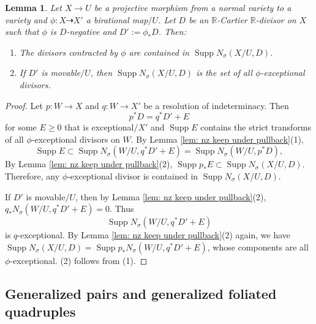 \documentclass[11pt]{amsart}
\numberwithin{equation}{section}
\newcommand{\Rr}{\mathbb{R}}
\newcommand{\Supp}{\operatorname{Supp}}
\newtheorem{lem}[thm]{Lemma}
\theoremstyle{definition}
\theoremstyle{definition}
\theoremstyle{definition}
\begin{document}
\begin{lem}\label{lem: nz for lc divisor}
Let $X\rightarrow U$ be a projective morphism from a normal variety to a variety and $\phi: X\dashrightarrow X'$ a birational map$/U$. Let $D$ be an $\Rr$-Cartier $\Rr$-divisor on $X$ such that $\phi$ is $D$-negative and $D':=\phi_*D$. Then:
\begin{enumerate}
    \item The divisors contracted by $\phi$ are contained in $\Supp N_{\sigma}(X/U,D)$.
    \item If $D'$ is movable$/U$, then $\Supp N_{\sigma}(X/U,D)$ is the set of all $\phi$-exceptional divisors.
    \end{enumerate}
 \end{lem}
\begin{proof}
Let $p: W\rightarrow X$ and $q: W\rightarrow X'$ be a resolution of indeterminacy. Then
$$p^*D=q^*D'+E$$
for some $E\geq 0$ that is exceptional$/X'$ and $\Supp E$ contains the strict transforms of all $\phi$-exceptional divisors on $W$. By Lemma \ref{lem: nz keep under pullback}(1),
$$
\Supp E\subset\Supp N_\sigma(W/U,q^*D'+E)=\Supp N_\sigma(W/U,p^*D),
$$
By Lemma \ref{lem: nz keep under pullback}(2), $\Supp p_*E\subset\Supp N_\sigma(X/U,D)$. Therefore, any $\phi$-exceptional divisor is contained in $\Supp N_\sigma(X/U,D)$.

If $D'$ is movable$/U$, then by Lemma \ref{lem: nz keep under pullback}(2), $q_*N_\sigma(W/U,q^*D'+E)=0$. Thus $$\Supp N_\sigma(W/U,q^*D'+E)$$ is $q$-exceptional. By Lemma \ref{lem: nz keep under pullback}(2) again, we have $\Supp N_\sigma(X/U,D)=\Supp p_*N_\sigma(W/U,q^*D'+E)$, whose components are all $\phi$-exceptional. (2) follows from (1).
\end{proof}


\subsection{Generalized pairs and generalized foliated quadruples}
\end{document}
